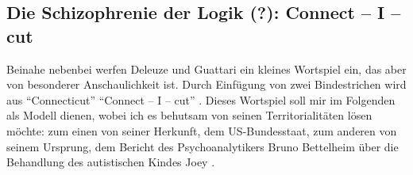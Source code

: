 \documentclass[12pt,
               DIV13,
               paper=a4,
               twoside=false,
               onehalfspacing,
               bibliography=totoc,
               toc=graduated,
               draft,
               ]{scrartcl}
\newcommand{\pc}[2]{\parencite[#1]{#2}}
\newcommand{\worries}[1]{\ifdraft{\textcolor{blue}{\texttt{(#1)}}}{}}
\newcommand{\gwg}{G--W--G'\xspace}
\newcommand{\cic}{Connect -- I -- cut\xspace}
\newcommand{\dg}{Deleuze und Guattari\xspace}
\begin{document}












\subsection{Die Schizophrenie der Logik (?): \cic}

%

Beinahe nebenbei werfen \dg ein kleines Wortspiel ein, das aber von
besonderer Anschaulichkeit ist. Durch Einfügung von zwei Bindestrichen
wird aus "`Connecticut"' "`\cic"' \pc{48}{ao}. Dieses Wortspiel soll
mir im Folgenden als Modell dienen, wobei ich es behutsam von seinen
Territorialitäten lösen möchte: zum einen von seiner Herkunft, dem
US-Bundesstaat, zum anderen von seinem Ursprung, dem Bericht des
Psychoanalytikers Bruno Bettelheim über die Behandlung des
autistischen Kindes Joey \parencites[vgl.][]{joey}[306-446]{emptyf}.
\end{document}
